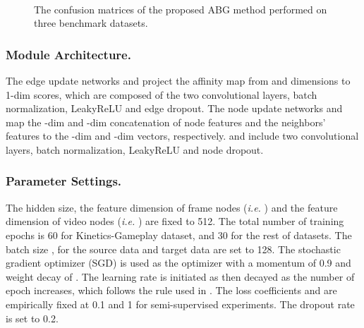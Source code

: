 \begin{figure}[t]
    \centering
    \\
    \caption{The confusion matrices of the proposed ABG method performed on three benchmark datasets.}
    \label{fig:cf}\vspace{-0.7cm}
\end{figure}


\subsubsection{Module Architecture.}
The edge update networks  and  project the affinity map from  and  dimensions to 1-dim scores, which are composed of the two convolutional layers, batch normalization, LeakyReLU and edge dropout. The node update networks  and  map the -dim and -dim concatenation of node features and the neighbors' features to the -dim and -dim vectors, respectively.  and  include two convolutional layers, batch normalization, LeakyReLU and node dropout.


\subsubsection{Parameter Settings.}
 The hidden size, the feature dimension of frame nodes (\textit{i.e.} ) and the feature dimension of video nodes (\textit{i.e.} ) are fixed to 512. The total number of training epochs  is 60 for Kinetics-Gameplay dataset, and 30 for the rest of datasets. The batch size ,  for the source data and target data are set to 128. The stochastic gradient optimizer (SGD) is used as the optimizer with a momentum of 0.9 and weight decay of . The learning rate  is initiated as  then decayed as the number of epoch increases, which follows the rule used in \cite{DANN,TAN}. The loss coefficients  and  are empirically fixed at 0.1 and 1 for semi-supervised experiments. The dropout rate is set to 0.2.



